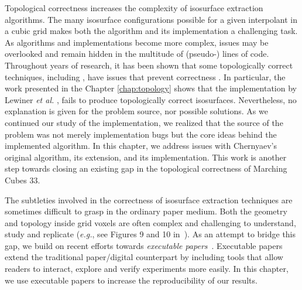 Topological correctness increases the complexity of isosurface extraction algorithms. 
The many isosurface configurations possible for a given interpolant in a cubic grid makes both the algorithm and its implementation a challenging task. 
%
As algorithms and implementations become more complex, issues may be overlooked and remain hidden in the multitude of (pseudo-) lines of code.
%
Throughout years of research, it has been shown that some topologically correct techniques, including \mc, have issues that prevent correctness  \cite{Etiene:2012:TVI:2197070.2197097, lopes:tvcg:2003, newman:candg:2006}. 
%
In particular, the work presented in the Chapter \ref{chap:topology} \cite{Etiene:2012:TVI:2197070.2197097} shows that the \mc{} implementation by Lewiner \emph{et al.} \cite{lewiner:impl,Lewiner:2003}, fails to produce topologically correct isosurfaces. 
%
Nevertheless, no explanation is given for the problem source, nor possible solutions. 
%
%
As we continued our study of the \mc{} implementation, we realized that the source of the problem was not merely implementation bugs but the core ideas behind the implemented algorithm.  
%
In this chapter, we address issues with Chernyaev's original algorithm, its extension, and its implementation. 
%
This work is another step towards closing an existing gap in the topological correctness of Marching Cubes 33.
 
 The subtleties involved in the correctness of isosurface extraction techniques are sometimes difficult to grasp in the ordinary paper medium. Both the geometry and topology inside grid voxels are often complex and challenging to understand,  study and replicate ({\em e.g.}, see Figures 9 and 10 in~\cite{Nielson03onmarching}).  As an attempt to bridge this gap, we build on recent efforts towards \emph{executable papers}~\cite{Koop:2011tv, Tohline:2010jn}. Executable papers extend the traditional paper/digital counterpart by including tools that allow readers to interact, explore and verify experiments more easily.  In this chapter, we use executable papers to increase the reproducibility of our results.
 
